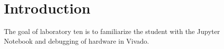 \section{Introduction}\label{sec: Introduction}
The goal of laboratory ten is to familiarize the student with the Jupyter Notebook and debugging of hardware in Vivado.